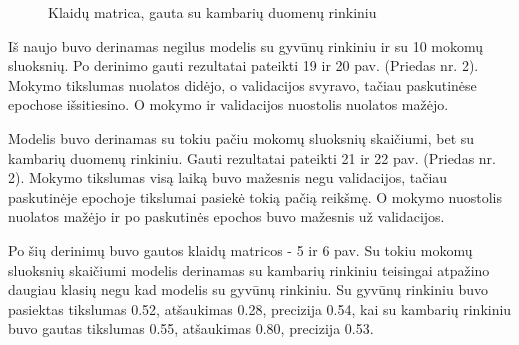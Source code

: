 \documentclass{VUMIFPSbakalaurinis}
\begin{document}
\begin{figure}[!htbp]
\begin{minipage}[b]{0.48\textwidth}
      \caption{Klaidų matrica, gauta su kambarių duomenų rinkiniu}
    \end{minipage}
\end{figure}

Iš naujo buvo derinamas negilus modelis su gyvūnų rinkiniu ir su 10 mokomų sluoksnių. 
Po derinimo gauti rezultatai pateikti 19 ir 20 pav. (Priedas nr. 2). Mokymo tikslumas nuolatos didėjo, o validacijos svyravo, tačiau paskutinėse epochose išsitiesino. O mokymo ir validacijos nuostolis nuolatos mažėjo.

Modelis buvo derinamas su tokiu pačiu mokomų sluoksnių skaičiumi, bet su kambarių duomenų rinkiniu.
Gauti rezultatai pateikti 21 ir 22 pav. (Priedas nr. 2). Mokymo tikslumas visą laiką buvo mažesnis negu validacijos, tačiau paskutinėje epochoje tikslumai pasiekė tokią pačią reikšmę. O mokymo nuostolis nuolatos mažėjo ir po paskutinės epochos buvo mažesnis už validacijos. 

Po šių derinimų buvo gautos klaidų matricos - 5 ir 6 pav. Su tokiu mokomų sluoksnių skaičiumi modelis derinamas su kambarių rinkiniu teisingai atpažino daugiau klasių negu kad modelis su gyvūnų rinkiniu. 
Su gyvūnų rinkiniu buvo pasiektas tikslumas 0.52, atšaukimas 0.28, precizija 0.54, kai su kambarių rinkiniu buvo gautas tikslumas 0.55, atšaukimas 0.80, precizija 0.53.
\end{document}
